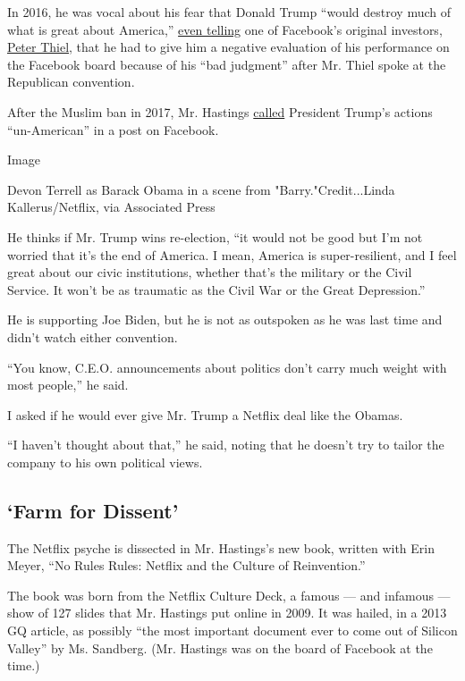 In 2016, he was vocal about his fear that Donald Trump ``would destroy
much of what is great about America,''
\href{https://www.nytimes3xbfgragh.onion/2017/08/08/technology/the-culture-wars-have-come-to-silicon-valley.html}{even
telling} one of Facebook's original investors,
\href{https://www.nytimes3xbfgragh.onion/2017/01/11/fashion/peter-thiel-donald-trump-silicon-valley-technology-gawker.html}{Peter
Thiel}, that he had to give him a negative evaluation of his performance
on the Facebook board because of his ``bad judgment'' after Mr. Thiel
spoke at the Republican convention.

After the Muslim ban in 2017, Mr. Hastings
\href{https://www.facebookcorewwwi.onion/reed1960/posts/10154654737174584}{called}
President Trump's actions ``un-American'' in a post on Facebook.

Image

Devon Terrell as Barack Obama in a scene from "Barry."Credit...Linda
Kallerus/Netflix, via Associated Press

He thinks if Mr. Trump wins re-election, ``it would not be good but I'm
not worried that it's the end of America. I mean, America is
super-resilient, and I feel great about our civic institutions, whether
that's the military or the Civil Service. It won't be as traumatic as
the Civil War or the Great Depression.''

He is supporting Joe Biden, but he is not as outspoken as he was last
time and didn't watch either convention.

``You know, C.E.O. announcements about politics don't carry much weight
with most people,'' he said.

I asked if he would ever give Mr. Trump a Netflix deal like the Obamas.

``I haven't thought about that,'' he said, noting that he doesn't try to
tailor the company to his own political views.

\hypertarget{farm-for-dissent}{%
\subsection{`Farm for Dissent'}\label{farm-for-dissent}}

The Netflix psyche is dissected in Mr. Hastings's new book, written with
Erin Meyer, ``No Rules Rules: Netflix and the Culture of Reinvention.''

The book was born from the Netflix Culture Deck, a famous --- and
infamous --- show of 127 slides that Mr. Hastings put online in 2009. It
was hailed, in a 2013 GQ article, as possibly ``the most important
document ever to come out of Silicon Valley'' by Ms. Sandberg. (Mr.
Hastings was on the board of Facebook at the time.)

